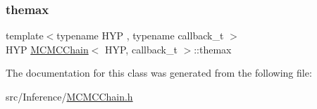 \mbox{\label{class_m_c_m_c_chain_a966ec00d236d4df6c477c6fd5575fd87}} 
\subsubsection{\texorpdfstring{themax}{themax}}
{\footnotesize\ttfamily template$<$typename H\+YP , typename callback\+\_\+t $>$ \\
H\+YP \hyperlink{class_m_c_m_c_chain}{M\+C\+M\+C\+Chain}$<$ H\+YP, callback\+\_\+t $>$\+::themax}



The documentation for this class was generated from the following file\+:\begin{DoxyCompactItemize}
\item 
src/\+Inference/\hyperlink{_m_c_m_c_chain_8h}{M\+C\+M\+C\+Chain.\+h}\end{DoxyCompactItemize}
